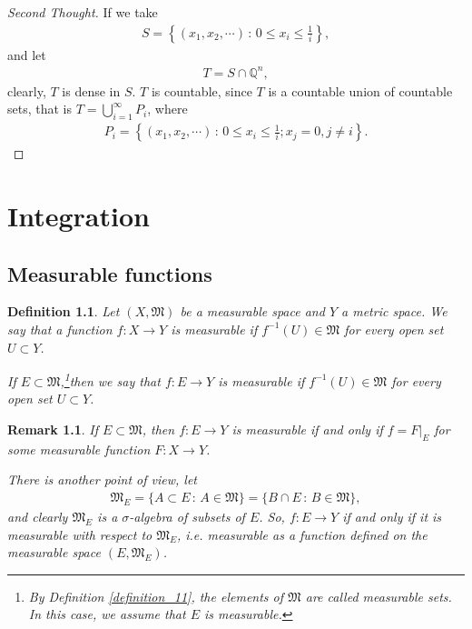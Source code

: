 \documentclass[11pt]{book}
\newtheorem{definition}{Definition}[chapter]
\newtheorem{remark}{Remark}[chapter]
\theoremstyle{definition}
\numberwithin{equation}{chapter}
\begin{document}
\medskip

\begin{proof}[Second Thought]
If we take
\begin{align*}
    S = \left\{(x_1, x_2, \cdots) \,:\, 0 \leq x_i \leq \frac{1}{i} \right\},
\end{align*}
and let
\begin{align*}
    T = S \cap \mathbb{Q}^n,
\end{align*}
clearly, $T$ is dense in $S$. $T$ is countable, since $T$ is a countable union of countable sets, that is $T = \bigcup^\infty_{i=1} P_i$, where
\begin{align*}
    P_i = \left\{(x_1, x_2, \cdots) \,:\, 0 \leq x_i \leq \frac{1}{i}; x_j = 0, j \neq i \right\}.
\end{align*}
\end{proof}

\medskip





\chapter{Integration}

\section{Measurable functions}

\begin{definition}\label{def_21}
Let $(X,\mathfrak{M})$ be a measurable space and $Y$ a metric space. We say that a function $f:X \to Y$ is measurable if $f^{-1}(U) \in \mathfrak{M}$ for every open set $U \subset Y$.

If $E \subset \mathfrak{M}$,\footnote{By Definition \ref{definition_11}, the elements of $\mathfrak{M}$ are called measurable sets. In this case, we assume that $E$ is measurable.}then we say that $f:E \to Y$ is measurable if $f^{-1}(U) \in \mathfrak{M}$ for every open set $U \subset Y$.
\end{definition}

\medskip

\begin{remark}
If $E \subset \mathfrak{M}$, then $f:E \to Y$ is measurable if and only if $f = F|_E$ for some measurable function $F: X \to Y$. 

There is another point of view, let
\begin{align*}
    \mathfrak{M}_E = \{A \subset E\,:\, A \in \mathfrak{M} \} = \{B \cap E\,:\, B \in \mathfrak{M}\},
\end{align*}
and clearly $\mathfrak{M}_E$ is a $\sigma$-algebra of subsets of $E$. So, $f:E \to Y$ if and only if it is measurable with respect to $\mathfrak{M}_E$, i.e. measurable as a function defined on the measurable space $(E,\mathfrak{M}_E)$.
\end{remark}
\end{document}
